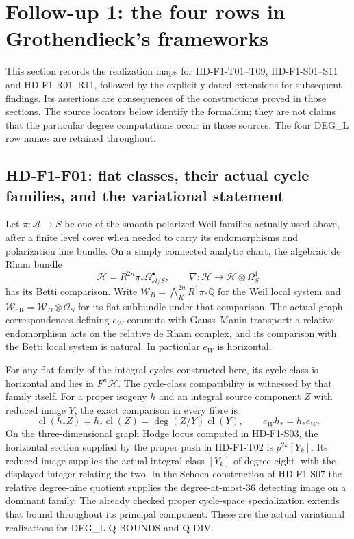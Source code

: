 \section{Follow-up 1: the four rows in Grothendieck's frameworks}
\label{sec:f1-grothendieck}

This section records the realization maps for HD-F1-T01--T09,
HD-F1-S01--S11 and HD-F1-R01--R11, followed by the explicitly
dated extensions for subsequent findings. Its assertions are consequences
of the constructions proved in those sections. The source locators
below identify the formalism; they are not claims that the particular
degree computations occur in those sources. The four DEG\_L row names
are retained throughout.

\subsection{HD-F1-F01: flat classes, their actual cycle families,
and the variational statement}

Let $\pi:\mathcal A\to S$ be one of the smooth polarized Weil
families actually used above, after a finite level cover when needed
to carry its endomorphisms and polarization line bundle. On a
simply connected analytic chart, the algebraic de Rham bundle
\[
 \mathcal H=R^{2n}\pi_*\Omega^\bullet_{\mathcal A/S},
 \qquad \nabla:\mathcal H\longrightarrow
                       \mathcal H\otimes\Omega_S^1
 \tag{F1F1.1}
\]
has its Betti comparison. Write
$\mathcal W_B=\bigwedge_K^{2n}R^1\pi_*\mathbb Q$
for the Weil local system and
$\mathcal W_{\mathrm{dR}}=\mathcal W_B\otimes\mathcal O_S$
for its flat subbundle under that comparison.
The actual graph correspondences defining $e_W$ commute with
Gauss--Manin transport: a relative endomorphism acts on the relative
de Rham complex, and its comparison with the Betti local system
is natural. In particular $e_W$ is horizontal.

For any flat family of the integral cycles constructed here,
its cycle class is horizontal and lies in $F^n\mathcal H$.
The cycle-class compatibility is witnessed by that family itself.
For a proper isogeny $h$ and an integral source component $Z$
with reduced image $Y$, the exact comparison in every fibre is
\[
 \operatorname{cl}(h_*Z)
       =h_*\operatorname{cl}(Z)
       =\deg(Z/Y)\operatorname{cl}(Y),\qquad
 e_Wh_*=h_*e_W.
 \tag{F1F1.2}
\]
On the three-dimensional graph Hodge locus computed in
HD-F1-S03, the horizontal section supplied by the proper push in
HD-F1-T02 is $p^{2k}[Y_k]$. Its reduced image supplies the actual
integral class $[Y_k]$ of degree eight, with the displayed integer
relating the two. In the Schoen construction of HD-F1-S07 the
relative degree-nine quotient supplies the degree-at-most-36
detecting image on a dominant family. The already checked proper
cycle-space specialization extends that bound throughout its
principal component. These are the actual variational realizations
for DEG\_L Q-BOUNDS and Q-DIV.

